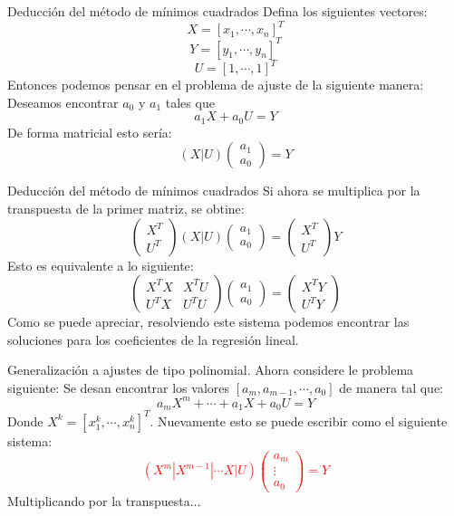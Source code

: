 \begin{frame}{Deducción del método de mínimos cuadrados}
Defina los siguientes vectores:
$$X=[x_1,\cdots,x_n]^T$$
$$Y=[y_1,\cdots,y_n]^T$$
$$U=[1,\cdots,1]^T$$
Entonces podemos pensar en el problema de ajuste de la siguiente manera: Deseamos encontrar $a_0$ y $a_1$ tales que
$$a_1X+a_0U=Y$$
De forma matricial esto sería:
\begin{displaymath}
(X|U)
\left(
\begin{array}{c}
a_1\\
a_0
\end{array}
\right)=Y
\end{displaymath}
\end{frame}
\begin{frame}{Deducción del método de mínimos cuadrados}
Si ahora se multiplica por la transpuesta de la primer matriz, se obtine:
\begin{displaymath}
\left(
\begin{array}{c}
X^T\\
U^T
\end{array}
\right)
(X|U)
\left(
\begin{array}{c}
a_1\\
a_0
\end{array}
\right)=
\left(
\begin{array}{c}
X^T\\
U^T
\end{array}
\right)
Y
\end{displaymath}
Esto es equivalente a lo siguiente:
\begin{displaymath}
\left(
\begin{array}{cc}
X^TX &X^TU\\
U^TX & U^TU
\end{array}
\right)
\left(
\begin{array}{c}
a_1\\
a_0
\end{array}
\right)=
\left(
\begin{array}{c}
X^TY\\
U^TY
\end{array}
\right)
\end{displaymath}
Como se puede apreciar, resolviendo este sistema podemos encontrar las soluciones para los coeficientes de la regresión lineal.
\end{frame}
\begin{frame}{Generalización a ajustes de tipo polinomial.}
Ahora considere le problema siguiente: Se desan encontrar los valores $[a_m,a_{m-1},\cdots,a_0]$ de manera tal que:
$$a_mX^m+\cdots+a_1X+a_0U=Y$$
Donde $X^k=[x_1^k,\cdots,x_n^k]^T$. Nuevamente esto se puede escribir como el siguiente sistema:
\textcolor{red}{
\begin{displaymath}
(X^m|X^{m-1}|\cdots X|U)
\left(
\begin{array}{c}
a_m\\
\vdots\\
a_0
\end{array}
\right)=Y
\end{displaymath}
}
Multiplicando por la transpuesta...
\end{frame}

